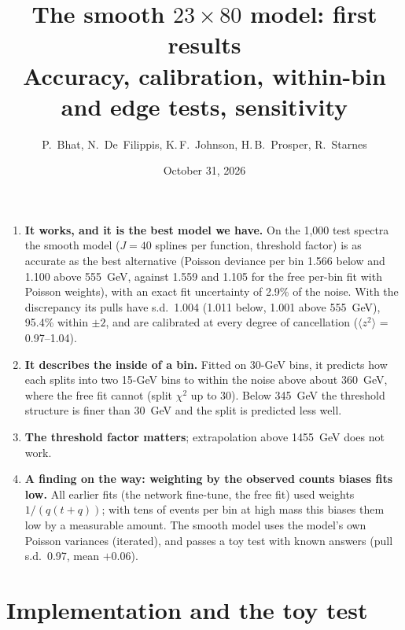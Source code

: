 
\title{\textbf{The smooth $23\times80$ model: first results}\\[4pt]
\large Accuracy, calibration, within-bin and edge tests, sensitivity}
\author{P.~Bhat, N.~De~Filippis, K.\,F.~Johnson, H.\,B.~Prosper, R.~Starnes}
\date{October 31, 2026}

\maketitle

\begin{keyidea}[In brief]
\begin{enumerate}
  \item \textbf{It works, and it is the best model we have.} On the 1,000 test spectra the
    smooth model ($J = 40$ splines per function, threshold factor) is as accurate as the best
    alternative (Poisson deviance per bin 1.566 below and 1.100 above 555~GeV, against 1.559
    and 1.105 for the free per-bin fit with Poisson weights), with an exact fit uncertainty of
    2.9\% of the noise. With the discrepancy its pulls have s.d.\ 1.004 (1.011 below, 1.001
    above 555~GeV), 95.4\% within $\pm2$, and are calibrated at every degree of cancellation
    ($\langle z^2\rangle$ = 0.97--1.04).
  \item \textbf{It describes the inside of a bin.} Fitted on 30-GeV bins, it predicts how
    each splits into two 15-GeV bins to within the noise above about 360~GeV, where the free
    fit cannot (split $\chi^2$ up to 30). Below 345~GeV the threshold structure is finer than
    30~GeV and the split is predicted less well.
  \item \textbf{The threshold factor matters}; extrapolation above 1455~GeV does not work.
  \item \textbf{A finding on the way: weighting by the observed counts biases fits low.}
    All earlier fits (the network fine-tune, the free fit) used weights $1/(q(t+q))$; with
    tens of events per bin at high mass this biases them low by a measurable amount. The
    smooth model uses the model's own Poisson variances (iterated), and passes a toy test
    with known answers (pull s.d.\ 0.97, mean $+0.06$).
\end{enumerate}
\end{keyidea}

\tableofcontents

\section{Implementation and the toy test}

